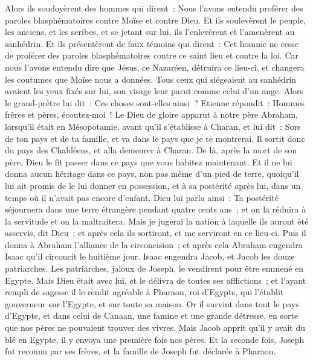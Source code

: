 \begin{multicols}{2}
Alors ils soudoyèrent des hommes qui dirent~: Nous l'avons entendu proférer des paroles blasphématoires contre Moïse et contre Dieu.
Et ils soulevèrent le peuple, les anciens, et les scribes, et se jetant sur lui, ils l'enlevèrent et l'amenèrent au sanhédrin.
Et ils présentèrent de faux témoins qui dirent~: Cet homme ne cesse de proférer des paroles blasphématoires contre ce saint lieu et contre la loi.
Car nous l'avons entendu dire que Jésus, ce Nazaréen, détruira ce lieu-ci, et changera les coutumes que Moïse nous a données.
Tous ceux qui siégeaient au sanhédrin avaient les yeux fixés sur lui, son visage leur parut comme celui d'un ange.
\VerseOne{}Alors le grand-prêtre lui dit~: Ces choses sont-elles ainsi~?
Etienne répondit~: Hommes frères et pères, écoutez-moi~! Le Dieu de gloire apparut à notre père Abraham, lorsqu'il était en Mésopotamie, avant qu'il s'établisse à Charan, et lui dit~:
Sors de ton pays et de ta famille, et va dans le pays que je te montrerai.
Il sortit donc du pays des Chaldéens, et alla demeurer à Charan. De là, après la mort de son père, Dieu le fit passer dans ce pays que vous habitez maintenant.
Et il ne lui donna aucun héritage dans ce pays, non pas même d'un pied de terre, quoiqu'il lui ait promis de le lui donner en possession, et à sa postérité après lui, dans un temps où il n'avait pas encore d'enfant.
Dieu lui parla ainsi~: Ta postérité séjournera dans une terre étrangère pendant quatre cents ans~; et on la réduira à la servitude et on la maltraitera.
Mais je jugerai la nation à laquelle ils auront été asservis, dit Dieu~; et après cela ils sortiront, et me serviront en ce lieu-ci.
Puis il donna à Abraham l'alliance de la circoncision~; et après cela Abraham engendra Isaac qu'il circoncit le huitième jour. Isaac engendra Jacob, et Jacob les douze patriarches.
Les patriarches, jaloux de Joseph, le vendirent pour être emmené en Egypte.
Mais Dieu était avec lui, et le délivra de toutes ses afflictions~; et l'ayant rempli de sagesse il le rendit agréable à Pharaon, roi d'Egypte, qui l'établit gouverneur sur l'Egypte, et sur toute sa maison.
Or il survint dans tout le pays d'Egypte, et dans celui de Canaan, une famine et une grande détresse, en sorte que nos pères ne pouvaient trouver des vivres.
Mais Jacob apprit qu'il y avait du blé en Egypte, il y envoya une première fois nos pères.
Et la seconde fois, Joseph fut reconnu par ses frères, et la famille de Joseph fut déclarée à Pharaon.

\end{multicols}
